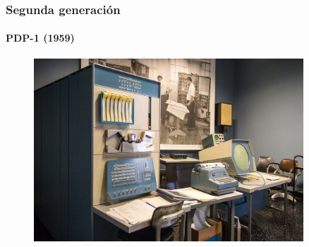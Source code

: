 \documentclass[11pt,a4paper,spanish]{beamer}
\begin{document}
\begin{frame}

\frametitle{Segunda generación}
\framesubtitle{PDP-1 (1959)}

\begin{figure}
    \includegraphics[width=0.9\textwidth]{img/pdp1.jpg}
    \captionsetup{textfont=tiny,labelformat=empty}
    \caption{\ccbysa\cite{pdp1}}
\end{figure}

\end{frame}
\end{document}
